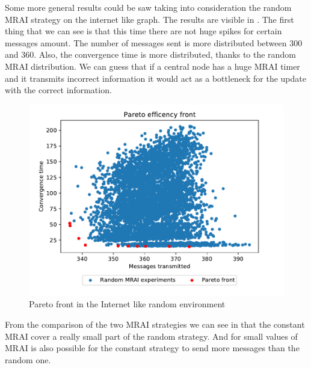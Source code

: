 \documentclass[10pt,conference,letterpaper]{IEEEtran}
\newcommand{\figwidth}{0.78}
\newcommand{\figvspace}{-1.5em}
\begin{document}
Some more general results could be saw taking into consideration the random \ac{MRAI}
strategy on the internet like graph.
The results are visible in .
The first thing that we can see is that this time there are not huge spikes 
for certain messages amount.
The number of messages sent is more distributed between \num{300} and \num{360}.
Also, the convergence time is more distributed, thanks to the random \ac{MRAI} distribution.
We can guess that if a central node has a huge \ac{MRAI} timer and it transmits
incorrect information it would act as a bottleneck for the update with the 
correct information.

\begin{figure}[tb]
	\centering
	\includegraphics[width=\figwidth\columnwidth]{images/internet_like/graph-100-random/random-multiple_mrais}
	\caption{Pareto front in the Internet like random environment}
	\label{fig:random_mrai_pareto_freq}
	\vspace{\figvspace}
\end{figure}

From the comparison of the two \ac{MRAI} strategies we can see in 
that the constant \ac{MRAI} cover a really small part of the random strategy.
And for small values of \ac{MRAI} is also possible for the constant strategy
to send more messages than the random one.
\end{document}
